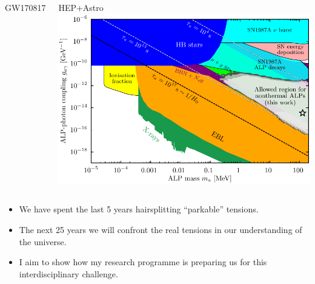 \documentclass[aspectratio=169, handout]{beamer}
\begin{document}
\begin{frame}
\begin{columns}
\begin{block}{GW170817}
        \end{block}
        \begin{block}{HEP+Astro}
            \includegraphics[width=\textwidth]{figures/cosmoalp.pdf}

            \hfill{}
        \end{block}
    \end{columns}

    \begin{itemize}
        \item We have spent the last 5 years hairsplitting ``parkable'' tensions.
        \item The next 25 years we will confront the real tensions in our understanding of the universe.
        \item I aim to show how my research programme is preparing us for this interdisciplinary challenge.
    \end{itemize}

\end{frame}
\end{document}
